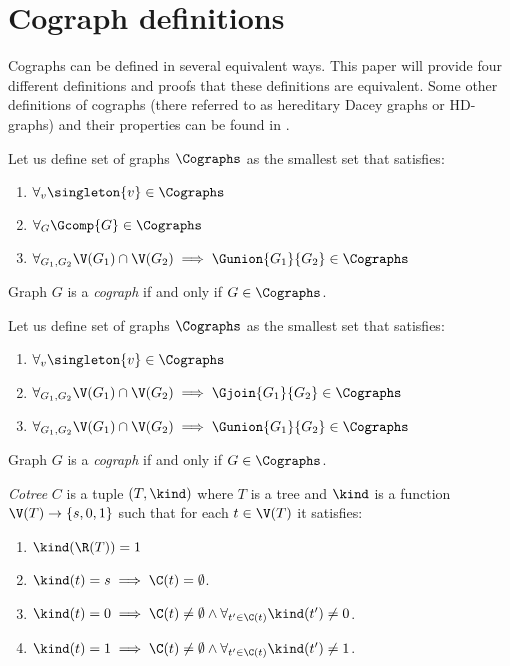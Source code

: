 
\section{Cograph definitions}

Cographs can be defined in several equivalent ways. This paper will provide four different definitions and proofs that these definitions are equivalent. Some other definitions of cographs (there referred to as hereditary Dacey graphs or HD-graphs) and their properties can be found in \cite{sumner}.

\begin{defi}\label{codef1}
    Let us define set of graphs $\Cographs$ as the smallest set that satisfies:
    \begin{enumerate}
        \item $\forall_v \singleton{v} \in \Cographs$
        \item $\forall_G \Gcomp{G} \in \Cographs$
        \item $\forall_{G_1, G_2} \V(G_1) \cap \V(G_2) \implies \Gunion{G_1}{G_2} \in \Cographs$
    \end{enumerate}
    Graph $G$ is a \emph{cograph} if and only if $G \in \Cographs$.
\end{defi}
\begin{defi}\label{codef2}
    Let us define set of graphs $\Cographs$ as the smallest set that satisfies:
    \begin{enumerate}
        \item $\forall_v \singleton{v} \in \Cographs$
        \item $\forall_{G_1, G_2} \V(G_1) \cap \V(G_2) \implies \Gjoin{G_1}{G_2} \in \Cographs$
        \item $\forall_{G_1, G_2} \V(G_1) \cap \V(G_2) \implies \Gunion{G_1}{G_2} \in \Cographs$
    \end{enumerate}
    Graph $G$ is a \emph{cograph} if and only if $G \in \Cographs$.
\end{defi}

\begin{defi}
    \emph{Cotree} $C$ is a tuple $(T, \kind)$ where $T$ is a tree and $\kind$ is a function $\V(T) \to \{s,0,1\}$ such that for each $t \in \V(T)$ it satisfies:
    \begin{enumerate}
        \item $\kind(\R(T)) = 1$
        \item $\kind(t) = s \implies \C(t) = \emptyset$.
        \item $\kind(t) = 0 \implies \C(t) \neq \emptyset \land \forall_{t' \in \C(t)} \kind(t') \neq 0$.
        \item $\kind(t) = 1 \implies \C(t) \neq \emptyset \land \forall_{t' \in \C(t)} \kind(t') \neq 1$.
    \end{enumerate}
\end{defi}

